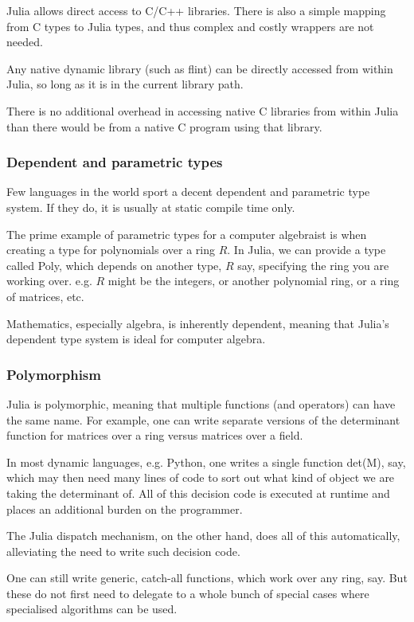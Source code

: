 \documentclass[a4paper,10pt]{article}
\begin{document}
Julia allows direct access to C/C++ libraries. There is also a simple mapping from C types to Julia
types, and thus complex and costly wrappers are not needed.

Any native dynamic library (such as flint) can be directly accessed from within Julia, so long
as it is in the current library path.

There is no additional overhead in accessing native C libraries from within Julia than there
would be from a native C program using that library.

\subsubsection{Dependent and parametric types}

Few languages in the world sport a decent dependent and parametric type system. If they
do, it is usually at static compile time only.

The prime example of parametric types for a computer algebraist is when creating a type for
polynomials over a ring $R$. In Julia, we can provide a type called Poly, which depends on
another type, $R$ say, specifying the ring you are working over. e.g. $R$ might be the
integers, or another polynomial ring, or a ring of matrices, etc.

Mathematics, especially algebra, is inherently dependent, meaning that Julia's dependent type system
is ideal for computer algebra.

\subsubsection{Polymorphism}
 
Julia is polymorphic, meaning that multiple functions (and operators) can have the same name. For
example, one can write separate versions of the determinant function for matrices over a ring versus
matrices over a field.

In most dynamic languages, e.g. Python, one writes a single function det(M), say, which
may then need many lines of code to sort out what kind of object we are taking the determinant of. All
of this decision code is executed at runtime and places an additional burden on the programmer. 

The Julia dispatch mechanism, on the other hand, does all of this automatically, alleviating the need
to write such decision code.

One can still write generic, catch-all functions, which work over any ring, say. But
these do not first need to delegate to a whole bunch of special cases where specialised
algorithms can be used. 
\end{document}
